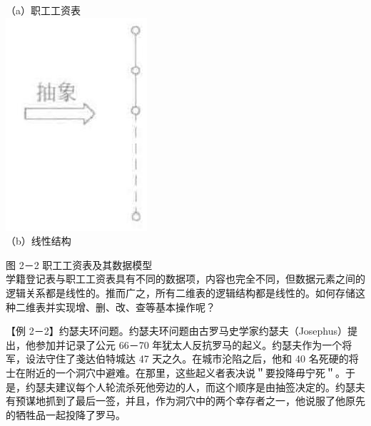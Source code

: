 \documentclass[10pt]{article}
\begin{document}
（a）职工工资表\\
\includegraphics[max width=\textwidth, center]{2025_06_06_704745ea57b15b2333e5g-041}\\
（b）线性结构

图 2－2 职工工资表及其数据模型\\
学籍登记表与职工工资表具有不同的数据项，内容也完全不同，但数据元素之间的逻辑关系都是线性的。推而广之，所有二维表的逻辑结构都是线性的。如何存储这种二维表并实现增、删、改、查等基本操作呢？

【例 2－2】约瑟夫环问题。约瑟夫环问题由古罗马史学家约瑟夫（Josephus）提出，他参加并记录了公元 66－70 年犹太人反抗罗马的起义。约瑟夫作为一个将军，设法守住了戔达伯特城达 47 天之久。在城市沦陷之后，他和 40 名死硬的将士在附近的一个洞穴中避难。在那里，这些起义者表决说＂要投降毋宁死＂。于是，约瑟夫建议每个人轮流杀死他旁边的人，而这个顺序是由抽签决定的。约瑟夫有预谋地抓到了最后一签，并且，作为洞穴中的两个幸存者之一，他说服了他原先的牺牲品一起投降了罗马。
\end{document}
